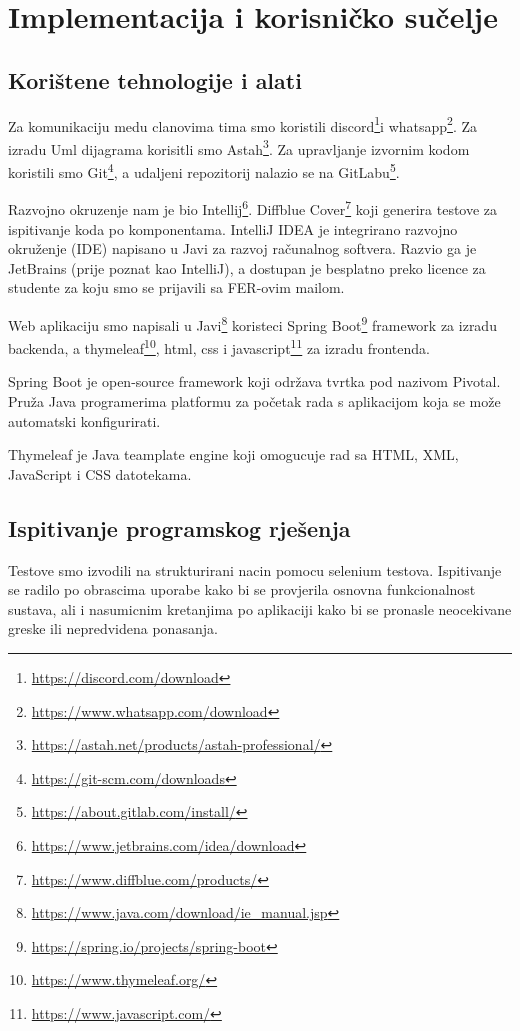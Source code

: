 \chapter{Implementacija i korisničko sučelje}
		
		
		\section{Korištene tehnologije i alati}
		
		Za komunikaciju medu clanovima tima smo koristili discord\footnote{\url{https://discord.com/download}}i whatsapp\footnote{\url{https://www.whatsapp.com/download}}.
		Za izradu Uml dijagrama korisitli smo Astah\footnote{\url{https://astah.net/products/astah-professional/}}.
		Za upravljanje izvornim kodom koristili smo Git\footnote{\url{https://git-scm.com/downloads}}, a udaljeni repozitorij nalazio se na GitLabu\footnote{\url{https://about.gitlab.com/install/}}.
		
		Razvojno okruzenje nam je bio Intellij\footnote{\url{https://www.jetbrains.com/idea/download}}.
		Diffblue Cover\footnote{\url{https://www.diffblue.com/products/}} koji generira testove za ispitivanje koda po komponentama. 
		IntelliJ IDEA je integrirano razvojno okruženje (IDE) napisano u Javi za razvoj računalnog softvera. 
		Razvio ga je JetBrains (prije poznat kao IntelliJ), a dostupan je besplatno preko licence za studente za koju smo se prijavili sa FER-ovim mailom.
		
		Web aplikaciju smo napisali u Javi\footnote{\url{https://www.java.com/download/ie_manual.jsp}} koristeci Spring Boot\footnote{\url{https://spring.io/projects/spring-boot}} framework za izradu backenda, a thymeleaf\footnote{\url{https://www.thymeleaf.org/}}, html, css i javascript\footnote{\url{https://www.javascript.com/}} za izradu frontenda.
		
		Spring Boot je open-source framework koji održava tvrtka pod nazivom Pivotal. Pruža Java programerima platformu za početak rada s aplikacijom koja se može automatski konfigurirati.
		
		Thymeleaf je Java teamplate engine koji omogucuje rad sa HTML, XML, JavaScript i CSS datotekama.
			\eject 
		
	
		\section{Ispitivanje programskog rješenja}
			
			
			 Testove smo izvodili na strukturirani nacin pomocu selenium testova.
			  Ispitivanje se radilo po obrascima uporabe kako bi se provjerila osnovna funkcionalnost sustava, ali i nasumicnim kretanjima po 
			  aplikaciji kako bi se pronasle neocekivane greske  ili nepredvidena ponasanja.			  
			
